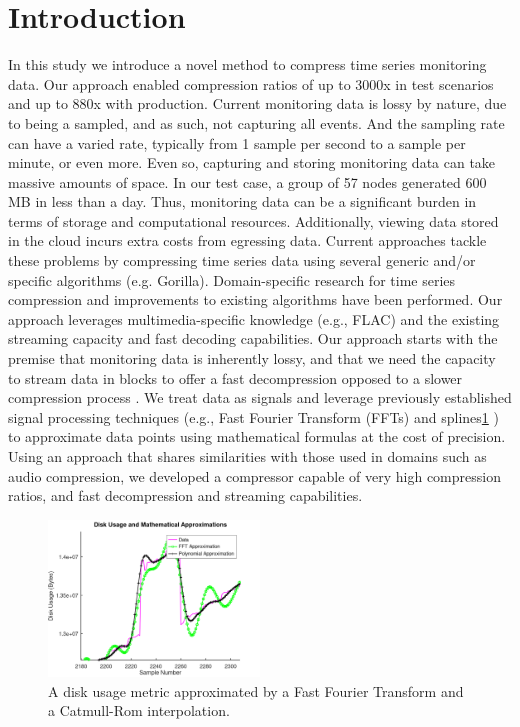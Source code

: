 \documentclass[conference]{IEEEtran}
\begin{document}
\section{Introduction}
In this study we introduce a novel method to compress time series monitoring data. 
Our approach enabled compression ratios of up to 3000x in test scenarios and up to 880x with production.
Current monitoring data is lossy by nature, due to being a sampled, and as such, not capturing all events. And the sampling rate can have a varied rate, typically from 1 sample per second to a sample per minute\cite{monitoring-samples}, or even more\cite{microsoft}.  
Even so, capturing and storing monitoring data can take massive amounts of space. In our test case, a group of 57 nodes generated 600 MB in less than a day.
Thus, monitoring data can be a significant burden in terms of storage and computational resources. Additionally, viewing data stored in the cloud incurs extra costs from egressing data.
Current approaches tackle these problems by compressing time series data using several generic and/or specific algorithms\cite{compression} (e.g. Gorilla\cite{gorilla}).
Domain-specific research for time series compression\cite{nasa-compression}\cite{smartgrid} and improvements to existing algorithms\cite{victoria} have been performed.
Our approach leverages multimedia-specific knowledge (e.g., FLAC\cite{flac}) and the existing streaming capacity and fast decoding capabilities.
Our approach starts with the premise that monitoring data is inherently lossy, and that we need the capacity to stream data in blocks to offer a fast decompression opposed to a slower compression process   .
We treat data as signals and leverage previously established signal processing techniques (e.g., Fast Fourier Transform (FFTs) and splines\ref{math_aprox}
) to approximate data points using mathematical formulas at the cost of precision.
Using an approach that shares similarities with those used in domains such as audio compression, we developed a compressor capable of very high compression ratios, and fast decompression and streaming capabilities.

\begin{figure}[ht]
  \centering
  \includegraphics[width=0.5\textwidth]{math_approximation-3.png}
  \caption{A disk usage metric approximated by a Fast Fourier Transform and a Catmull-Rom interpolation.}
  \label{math_aprox}
\end{figure}
\end{document}
